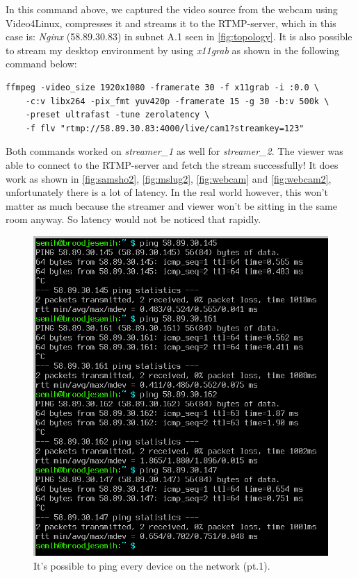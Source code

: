 \documentclass[a4paper,1pt]{article}
\begin{document}
In this command above, 
we captured the video source from the webcam using Video4Linux, compresses it and streams it to the RTMP-server, which in this case is: \textit{Nginx} (58.89.30.83) in subnet A.1 seen in \autoref{fig:topology}. 
It is also possible to stream my desktop environment by using \textit{x11grab} as shown in the following command below:
  
  \begin{Verbatim}[frame=single, tabsize=4]
  ffmpeg -video_size 1920x1080 -framerate 30 -f x11grab -i :0.0 \
    -c:v libx264 -pix_fmt yuv420p -framerate 15 -g 30 -b:v 500k \
    -preset ultrafast -tune zerolatency \
    -f flv "rtmp://58.89.30.83:4000/live/cam1?streamkey=123"
  \end{Verbatim}
Both commands worked on \textit{streamer\_1} as well for \textit{streamer\_2}. The viewer was able to connect to the RTMP-server and fetch the stream successfully! 
It does work as shown in \autoref{fig:samsho2}, \autoref{fig:mslug2}, \autoref{fig:webcam} and \autoref{fig:webcam2}, unfortunately there is a lot of latency. 
In the real world however, this won't matter as much because the streamer and viewer won't be sitting in the same room anyway. So latency would not be noticed that rapidly.
\pagebreak

\begin{figure}[H]
	\centering
	\includegraphics[width=13.5cm]{bewijs1.png}
	\caption{It's possible to ping every device on the network (pt.1).}
	\label{fig:ping1}
\end{figure}
\end{document}

